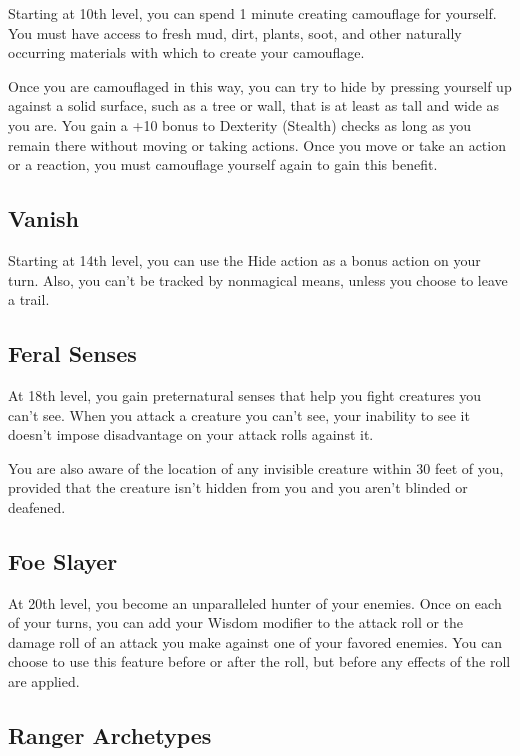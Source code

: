 Starting at 10th level, you can spend 1 minute creating camouflage for yourself. You must have access to fresh mud, dirt, plants, soot, and other naturally occurring materials with which to create your camouflage.

Once you are camouflaged in this way, you can try to hide by pressing yourself up against a solid surface, such as a tree or wall, that is at least as tall and wide as you are. You gain a +10 bonus to Dexterity (Stealth) checks as long as you remain there without moving or taking actions. Once you move or take an action or a reaction, you must camouflage yourself again to gain this benefit.

\subsection{Vanish}

Starting at 14th level, you can use the Hide action as a bonus action on your turn. Also, you can’t be tracked by nonmagical means, unless you choose to leave a trail.

\subsection{Feral Senses}

At 18th level, you gain preternatural senses that help you fight creatures you can’t see. When you attack a creature you can’t see, your inability to see it doesn’t impose disadvantage on your attack rolls against it.

You are also aware of the location of any invisible creature within 30 feet of you, provided that the creature isn’t hidden from you and you aren’t blinded or deafened.

\subsection{Foe Slayer}

At 20th level, you become an unparalleled hunter of your enemies. Once on each of your turns, you can add your Wisdom modifier to the attack roll or the damage roll of an attack you make against one of your favored enemies. You can choose to use this feature before or after the roll, but before any effects of the roll are applied.

\subsection{Ranger Archetypes}

